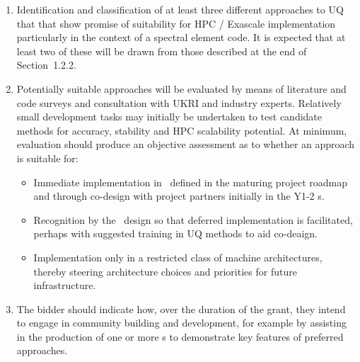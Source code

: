 \begin{enumerate}

\item Identification and classification of at least three different approaches to
UQ that that show promise of suitability for HPC / Exascale implementation
particularly in the context of a spectral element code. It is expected that at least
two of these will be drawn from those described at the end of Section~1.2.2.

\item Potentially suitable approaches will be evaluated by means of 
literature and code surveys and consultation
with UKRI and industry experts.
Relatively small development tasks may initially be undertaken to 
test candidate methods for
accuracy, stability and HPC scalability potential.
At minimum, evaluation should produce an objective assessment as to
whether an approach is suitable for:
\begin{itemize}
\item Immediate implementation in \nep\ defined in the maturing project roadmap
and through co-design with project partners initially in the Y1-2 \papp s.
\item Recognition by the \nep\ design so that deferred implementation is facilitated,
perhaps with suggested training in UQ methods to aid co-deaign.
\item Implementation only in a restricted class of machine architectures, thereby
steering architecture choices and priorities for future infrastructure.
\end{itemize}

\item The bidder should indicate how, over the duration of the grant, they intend to engage
in community building and development, for example by assisting in the production
of one or more \papp s to demonstrate key features of preferred approaches.

\end{enumerate}

%

